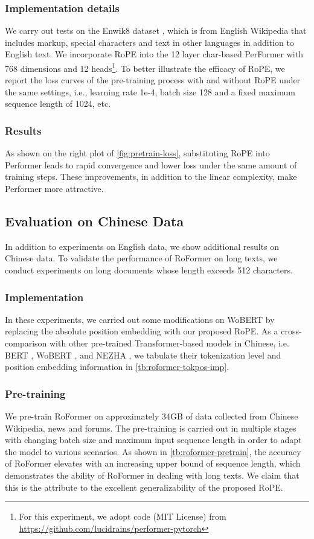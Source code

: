 \subsubsection{Implementation details} We carry out tests on the Enwik8 dataset \cite{enwik8}, which is from English Wikipedia that includes markup, special characters and text in other languages in addition to English text. We incorporate RoPE into the 12 layer char-based PerFormer with 768 dimensions and 12 heads\footnote{For this experiment, we adopt code (MIT License) from \url{https://github.com/lucidrains/performer-pytorch}}. 
To better illustrate the efficacy of RoPE,  we report the loss curves of the pre-training process with and without RoPE under the same settings, i.e., learning rate 1e-4, batch size 128 and a fixed maximum sequence length of 1024, etc. 

\subsubsection{Results} 
As shown on the right plot of \ref{fig:pretrain-loss}, substituting RoPE into Performer leads to rapid convergence and lower loss under the same amount of training steps. These improvements, in addition to the linear complexity,  make Performer more attractive. 

\subsection{Evaluation on Chinese Data}\label{subsec:chinese}
In addition to experiments on English data, we show additional results on Chinese data.  To validate the performance of RoFormer on long texts, we conduct experiments on long documents whose length exceeds 512 characters.

\subsubsection{Implementation} 
In these experiments, we carried out some modifications on WoBERT \cite{zhuiyipretrainedmodels} by replacing the absolute position embedding with our proposed RoPE. As a cross-comparison with other pre-trained Transformer-based models in Chinese, i.e. BERT \cite{Devlin2019BERTPO}, WoBERT \cite{zhuiyipretrainedmodels}, and NEZHA \cite{nezha},  we tabulate their tokenization level and position embedding information in \ref{tb:roformer-tokpos-imp}.

\subsubsection{Pre-training} 
We pre-train RoFormer on approximately 34GB of data collected from Chinese Wikipedia, news and forums. The pre-training is carried out in multiple stages with changing batch size and maximum input sequence length in order to adapt the model to various scenarios. As shown in \ref{tb:roformer-pretrain}, the accuracy of RoFormer elevates with an increasing upper bound of sequence length, which demonstrates the ability of RoFormer in dealing with long texts. We claim that this is the attribute to the excellent generalizability of the proposed RoPE.  

